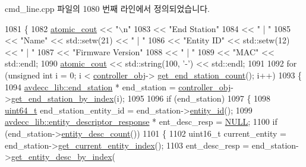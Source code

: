 cmd\+\_\+line.\+cpp 파일의 1080 번째 라인에서 정의되었습니다.


\begin{DoxyCode}
1081 \{
1082     \hyperlink{cmd__line_8h_a0bc38ccc65c79ba06c6fcd7b4bf554c3}{atomic\_cout} << \textcolor{stringliteral}{"\(\backslash\)n"}
1083                 << \textcolor{stringliteral}{"End Station"}
1084                 << \textcolor{stringliteral}{"  |  "}
1085                 << \textcolor{stringliteral}{"Name"} << std::setw(21) << \textcolor{stringliteral}{"  |  "}
1086                 << \textcolor{stringliteral}{"Entity ID"} << std::setw(12) << \textcolor{stringliteral}{"  |  "}
1087                 << \textcolor{stringliteral}{"Firmware Version"}
1088                 << \textcolor{stringliteral}{"  |  "}
1089                 << \textcolor{stringliteral}{"MAC"} << std::endl;
1090     \hyperlink{cmd__line_8h_a0bc38ccc65c79ba06c6fcd7b4bf554c3}{atomic\_cout} << std::string(100, \textcolor{charliteral}{'-'}) << std::endl;
1091 
1092     \textcolor{keywordflow}{for} (\textcolor{keywordtype}{unsigned} \textcolor{keywordtype}{int} i = 0; i < \hyperlink{classcmd__line_af0a7784509e5bf1210a2aa19cea5df70}{controller\_obj}->
      \hyperlink{classavdecc__lib_1_1controller_ab5ddf7b4a9718fe3e821289141f44485}{get\_end\_station\_count}(); i++)
1093     \{
1094         \hyperlink{classavdecc__lib_1_1end__station}{avdecc\_lib::end\_station} * end\_station = 
      \hyperlink{classcmd__line_af0a7784509e5bf1210a2aa19cea5df70}{controller\_obj}->\hyperlink{classavdecc__lib_1_1controller_a2a8ec1205ea0d5fdd6f833285257d0d0}{get\_end\_station\_by\_index}(i);
1095 
1096         \textcolor{keywordflow}{if} (end\_station)
1097         \{
1098             \hyperlink{parse_8c_aec6fcb673ff035718c238c8c9d544c47}{uint64\_t} end\_station\_entity\_id = end\_station->\hyperlink{classavdecc__lib_1_1end__station_a3374e7e9d63f8e1756480b16df9bc0c0}{entity\_id}();
1099             \hyperlink{classavdecc__lib_1_1entity__descriptor__response}{avdecc\_lib::entity\_descriptor\_response} * ent\_desc\_resp = 
      \hyperlink{openavb__types__base__pub_8h_a070d2ce7b6bb7e5c05602aa8c308d0c4}{NULL};
1100             \textcolor{keywordflow}{if} (end\_station->\hyperlink{classavdecc__lib_1_1end__station_a14c0322d46a8800dbb4908716db50d86}{entity\_desc\_count}())
1101             \{
1102                 uint16\_t current\_entity = end\_station->\hyperlink{classavdecc__lib_1_1end__station_aaf7e2defcfdf88c62c04fd88bd49787d}{get\_current\_entity\_index}();
1103                 ent\_desc\_resp = end\_station->\hyperlink{classavdecc__lib_1_1end__station_a7456434346294f611e4d37255be4051b}{get\_entity\_desc\_by\_index}(

\end{DoxyCode}
